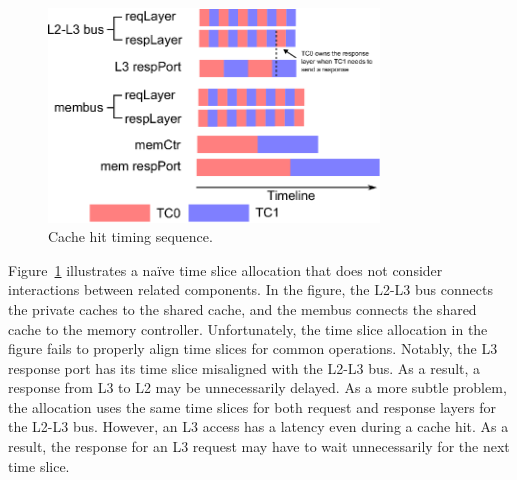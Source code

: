 
\begin{figure}
    \begin{center}
        \includegraphics[width=3.46in]{figs/baseline_schedule.eps}
        \caption{Cache hit timing sequence.}
        \label{fig:naive_scheme}
    \end{center}
\end{figure}

Figure~\ref{fig:naive_scheme} illustrates a naïve time slice allocation that
does not consider interactions between related components.
In the figure, the L2-L3 bus connects the private caches 
to the shared cache, and the membus connects the shared cache to the memory 
controller.
Unfortunately, the time slice allocation in the figure fails to properly
align time slices for common operations.
Notably, the L3 response port has its time slice misaligned with the L2-L3
bus. As a result, a response from L3 to L2 may be unnecessarily delayed.
As a more subtle problem, the allocation uses the same time slices for both
request and response layers for the L2-L3 bus. However, an L3 access has
a latency even during a cache hit. As a result, the response for an L3 request may
have to wait unnecessarily for the next time slice. 


